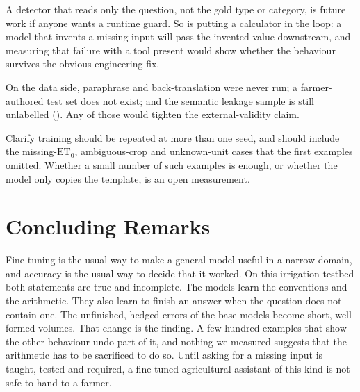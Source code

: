 A detector that reads only the question, not the gold type or category, is future work if anyone wants a runtime guard. So is putting a calculator in the loop: a model that invents a missing input will pass the invented value downstream, and measuring that failure with a tool present would show whether the behaviour survives the obvious engineering fix.

On the data side, paraphrase and back-translation were never run; a farmer-authored test set does not exist; and the semantic leakage sample is still unlabelled (). Any of those would tighten the external-validity claim.

Clarify training should be repeated at more than one seed, and should include the missing-$\mathrm{ET}_0$, ambiguous-crop and unknown-unit cases that the first \ClarifyTrainRows examples omitted. Whether a small number of such examples is enough, or whether the model only copies the template, is an open measurement.

\section{Concluding Remarks}
\label{sec:closing}

Fine-tuning is the usual way to make a general model useful in a narrow domain, and accuracy is the usual way to decide that it worked. On this irrigation testbed both statements are true and incomplete. The models learn the conventions and the arithmetic. They also learn to finish an answer when the question does not contain one. The unfinished, hedged errors of the base models become short, well-formed volumes. That change is the finding. A few hundred examples that show the other behaviour undo part of it, and nothing we measured suggests that the arithmetic has to be sacrificed to do so. Until asking for a missing input is taught, tested and required, a fine-tuned agricultural assistant of this kind is not safe to hand to a farmer.
